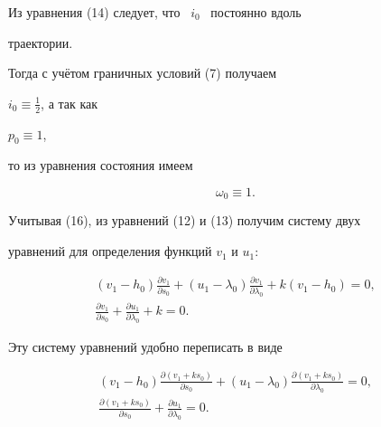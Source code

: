 Из уравнения (14) следует,  что \ $i_0$ \ постоянно вдоль


траектории.





Тогда с учётом граничных условий (7) получаем


$ i_0 \equiv  \frac{1}{2}$,  а так как


$p_0 \equiv 1$,


то из уравнения состояния имеем


\begin{equation}


\omega_0 \equiv 1.


\end{equation}





Учитывая (16),  из уравнений (12) и (13) получим систему двух


уравнений для определения функций $v_1$ и $u_1$:


\begin{gather}


(v_1 - h_0) \frac{\partial v_1}{\partial


s_0} + (u_1 - \lambda_0)  \frac{\partial v_1}{\partial


\lambda_0} +k (v_1-h_0) = 0, \\


 \frac{\partial


v_1}{\partial s_0} + \frac{\partial u_1}{\partial


\lambda_0} + k = 0.


\end{gather}


Эту систему уравнений удобно переписать в виде


\begin{gather}


(v_1 - h_0) \frac{\partial {(v_1 + k s_0)}}{\partial


s_0} +  \left(u_1-\lambda_0\right) \frac{\partial


{(v_1 + k s_0)}}{\partial \lambda_0} = 0,


\\


\frac{\partial {(v_1 + k s_0)}}{\partial


s_0} + \frac{\partial u_1}{\partial \lambda_0} = 0.


\end{gather}





